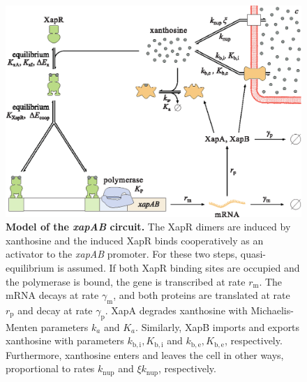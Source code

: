 \documentclass[10pt,letterpaper]{article}
\newcommand{\n}[1]{\mathrm{#1}}
\begin{document}
\begin{figure}[h!]
	\centering
	\includegraphics{media/XapSystem.eps}
	\caption{{\bf Model of the \emph{xapAB} circuit.}
		The XapR dimers are induced by xanthosine and the induced XapR binds
		cooperatively as an activator to the \emph{xapAB} promoter. For
		these two steps, quasi-equilibrium is assumed. If both XapR binding
		sites are occupied and the polymerase is bound, the gene is
		transcribed at rate $r_{\n{m}}$. The mRNA decays at rate
		$\gamma_{\n{m}}$, and both proteins are translated at rate
		$r_{\n{p}}$ and decay at rate $\gamma_{\n{p}}$. XapA degrades
		xanthosine with Michaelis-Menten parameters $k_{a}$ and $K_a$.
		Similarly, XapB imports and exports xanthosine with parameters
		$k_{\n{b,i}}, K_{\n{b,i}}$ and $k_{\n{b,e}}, K_{\n{b,e}}$,
		respectively. Furthermore, xanthosine enters and leaves the cell in
		other ways, proportional to rates $k_{\n{nup}}$ and $\xi
		k_{\n{nup}}$, respectively.}
	\label{fig2:model}
\end{figure}
\end{document}
